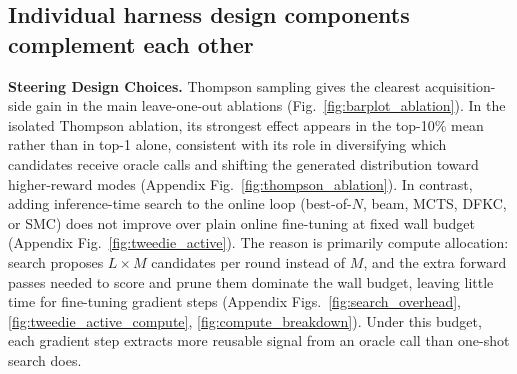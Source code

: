 \documentclass{article}
\begin{document}
\subsection{Individual harness design components complement each other}\label{sec:results-method}


\textbf{Steering Design Choices.}
Thompson sampling gives the clearest acquisition-side gain in the main leave-one-out ablations (Fig.~\ref{fig:barplot_ablation}). In the isolated Thompson ablation, its strongest effect appears in the top-10\% mean rather than in top-1 alone, consistent with its role in diversifying which candidates receive oracle calls and shifting the generated distribution toward higher-reward modes (Appendix Fig.~\ref{fig:thompson_ablation}).
In contrast, adding inference-time search to the online loop (best-of-$N$, beam, MCTS, DFKC, or SMC) does not improve over plain online fine-tuning at fixed wall budget (Appendix Fig.~\ref{fig:tweedie_active}). The reason is primarily compute allocation: search proposes $L \times M$ candidates per round instead of $M$, and the extra forward passes needed to score and prune them dominate the wall budget, leaving little time for fine-tuning gradient steps (Appendix Figs.~\ref{fig:search_overhead}, \ref{fig:tweedie_active_compute}, \ref{fig:compute_breakdown}). Under this budget, each gradient step extracts more reusable signal from an oracle call than one-shot search does.

\end{document}
